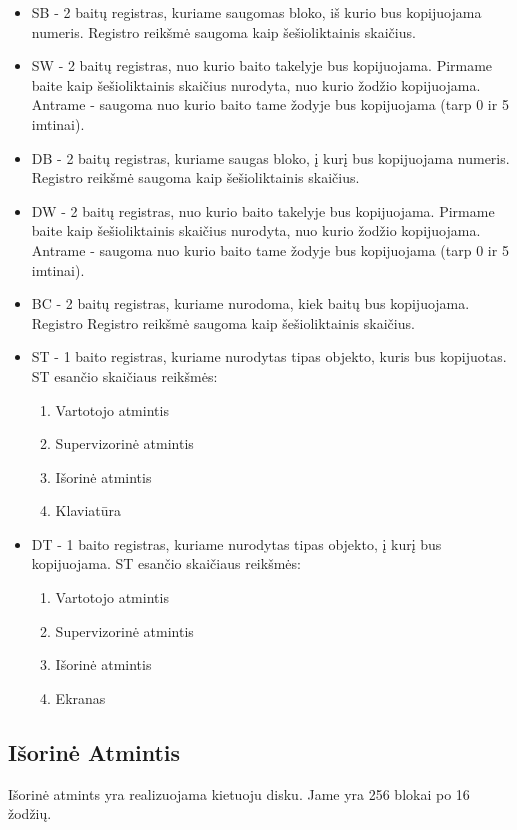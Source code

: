 \documentclass{VUMIFInfKursinis}
\begin{document}
\begin{itemize}
	\item SB - 2 baitų registras, kuriame saugomas bloko, iš kurio bus kopijuojama numeris. Registro reikšmė saugoma kaip šešioliktainis skaičius.
	\item SW - 2 baitų registras, nuo kurio baito takelyje bus kopijuojama. Pirmame baite kaip šešioliktainis skaičius nurodyta, nuo kurio žodžio kopijuojama. Antrame - saugoma nuo kurio baito tame žodyje bus kopijuojama (tarp 0 ir 5 imtinai).
	\item DB - 2 baitų registras, kuriame saugas bloko, į kurį bus kopijuojama numeris. Registro reikšmė saugoma kaip šešioliktainis skaičius.
	\item DW - 2 baitų registras, nuo kurio baito takelyje bus kopijuojama. Pirmame baite kaip šešioliktainis skaičius nurodyta, nuo kurio žodžio kopijuojama. Antrame - saugoma nuo kurio baito tame žodyje bus kopijuojama (tarp 0 ir 5 imtinai).
	\item BC - 2 baitų registras, kuriame nurodoma, kiek baitų bus kopijuojama. Registro Registro reikšmė saugoma kaip šešioliktainis skaičius.
	\item ST - 1 baito registras, kuriame nurodytas tipas objekto, kuris bus kopijuotas. ST esančio skaičiaus reikšmės:
	\begin{enumerate}
		\item Vartotojo atmintis
		\item Supervizorinė atmintis
		\item Išorinė atmintis
		\item Klaviatūra
	\end{enumerate}
	\item DT - 1 baito registras, kuriame nurodytas tipas objekto, į kurį bus kopijuojama. ST esančio skaičiaus reikšmės:
	\begin{enumerate}
		\item Vartotojo atmintis
		\item Supervizorinė atmintis
		\item Išorinė atmintis
		\item Ekranas
	\end{enumerate}
\end{itemize}

\subsection{Išorinė Atmintis}

Išorinė atmints yra realizuojama kietuoju disku. Jame yra 256 blokai po 16 žodžių.
\end{document}
